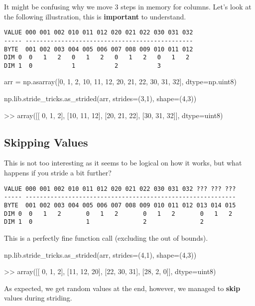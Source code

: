 \documentclass[oneside, 12pt]{report}
\begin{document}
It might be confusing why we move 3 steps in memory for columns. Let's look at the following illustration, this is \textbf{important} to understand.

\begin{verbatim}
VALUE 000 001 002 010 011 012 020 021 022 030 031 032
----- -----------------------------------------------
BYTE  001 002 003 004 005 006 007 008 009 010 011 012
DIM 0  0   1   2   0   1   2   0   1   2   0   1   2 
DIM 1  0           1           2           3 
\end{verbatim}

\begin{python}
arr = np.asarray([0, 1, 2,
                  10, 11, 12,
                  20, 21, 22,
                  30, 31, 32], dtype=np.uint8)
 
np.lib.stride_tricks.as_strided(arr, strides=(3,1), shape=(4,3))
 
>> array([[ 0,  1,  2],
          [10, 11, 12],
          [20, 21, 22],
          [30, 31, 32]], dtype=uint8)
\end{python}

\subsection{Skipping Values}

This is not too interesting as it seems to be logical on how it works, but what happens if you stride a bit further?

\begin{verbatim}
VALUE 000 001 002 010 011 012 020 021 022 030 031 032 ??? ??? ???
----- -----------------------------------------------------------
BYTE  001 002 003 004 005 006 007 008 009 010 011 012 013 014 015
DIM 0  0   1   2       0   1   2       0   1   2       0   1   2  
DIM 1  0               1               2               2          
\end{verbatim}

This is a perfectly fine function call (excluding the out of bounds).

\begin{python}
np.lib.stride_tricks.as_strided(arr, strides=(4,1), shape=(4,3))

>> array([[ 0,  1,  2],
          [11, 12, 20],
          [22, 30, 31],
          [28,  2,  0]], dtype=uint8)
\end{python}

As expected, we get random values at the end, however, we managed to \textbf{skip} values during striding.
\end{document}
